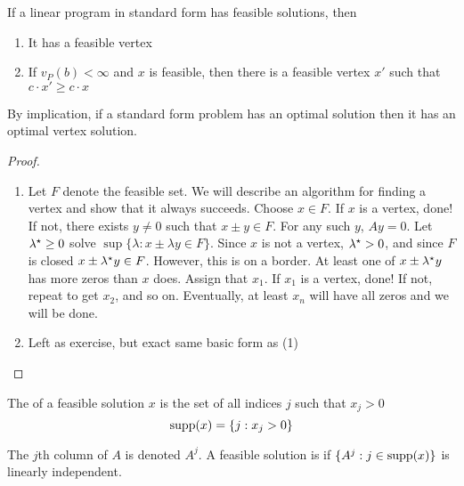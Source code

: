 \documentclass[10pt]{article}
\begin{document}
\begin{theorem}
	 If a linear program in standard form has feasible solutions, then 
	\begin{enumerate}
		\item It has a feasible vertex
		\item If $v_P(b)< \infty$ and $x$ is feasible, then there is a feasible vertex $x'$ such that $c \cdot x' \ge c \cdot x$
	\end{enumerate}
\end{theorem}
\begin{remark}
	By implication, if a standard form problem has an optimal solution then it has an optimal vertex solution.
\end{remark}

\begin{proof}
	\begin{enumerate}
		\item Let $F$ denote the feasible set. We will describe an algorithm for finding a vertex and show that it always succeeds. Choose $x \in F$. If $x$ is a vertex, done! If not, there exists $y \ne 0$ such that $x \pm y \in F$. For any such $y$, $Ay = 0$. Let $\lambda^\star \ge 0$ solve $\sup \{\lambda : x \pm \lambda y \in F\}$. Since $x$ is not a vertex, $\lambda^\star > 0$, and since $F$ is closed $x \pm \lambda^\star y \in F$. However, this is on a border. At least one of $x \pm \lambda^\star y$ has more zeros than $x$ does. Assign that $x_1$. If $x_1$ is a vertex, done! If not, repeat to get $x_2$, and so on. Eventually, at least $x_n$ will have all zeros and we will be done.
		\item Left as exercise, but exact same basic form as (1)
	\end{enumerate}
\end{proof}

\begin{definition}
	The  of a feasible solution $x$ is the set of all indices $j$ such that $x_j > 0$ \[\mathop{\rm supp}(x) = \{j : x_j > 0\}\]
\end{definition}

\begin{definition}
	The $j$th column of $A$ is denoted $A^j$. A feasible solution is  if $\{A^j : j \in \mathop{\rm supp}(x)\}$ is linearly independent.
\end{definition}
\end{document}
